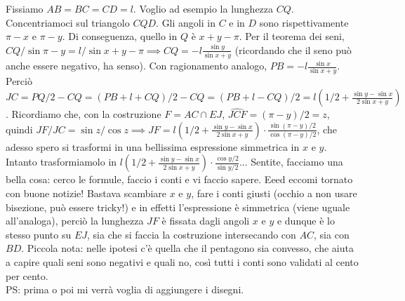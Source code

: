 \begin{sol}
  Fissiamo $AB=BC=CD=l$. Voglio ad esempio la lunghezza $CQ$. Concentriamoci sul triangolo $CQD$. Gli angoli in $C$ e in $D$ sono rispettivamente $\pi-x$ e $\pi-y$. Di conseguenza, quello in $Q$ è $x+y-\pi$. Per il teorema dei seni, $CQ/\sin{\pi-y}=l/\sin{x+y-\pi} \implies CQ=-l\frac{\sin{y}}{\sin{x+y}}$ (ricordando che il seno può anche essere negativo, ha senso). Con ragionamento analogo, $PB=-l\frac{\sin{x}}{\sin{x+y}}$.
  Perciò $JC=PQ/2-CQ=(PB+l+CQ)/2-CQ=(PB+l-CQ)/2=l\left(1/2+\frac{\sin{y}-\sin{x}}{2\sin{x+y}}\right)$.
  Ricordiamo che, con la costruzione $F=AC \cap EJ$, $\widehat{JCF}=(\pi-y)/2=z$, quindi $JF/JC=\sin{z}/\cos{z} \implies JF=l\left(1/2+\frac{\sin{y}-\sin{x}}{2\sin{x+y}}\right) \cdot \frac{\sin{(\pi-y)/2}}{\cos{(\pi-y)/2}}$, che adesso spero si trasformi in una bellissima espressione simmetrica in $x$ e $y$.
  Intanto trasformiamolo in $l\left(1/2+\frac{\sin{y}-\sin{x}}{2\sin{x+y}}\right) \cdot \frac{\cos{y/2}}{\sin{y/2}}$... Sentite, facciamo una bella cosa: cerco le formule, faccio i conti e vi faccio sapere. Eeed eccomi tornato con buone notizie! Bastava scambiare $x$ e $y$, fare i conti giusti (occhio a non usare bisezione, può essere tricky!) e in effetti l'espressione è simmetrica (viene uguale all'analoga), perciò la lunghezza $JF$ è fissata dagli angoli $x$ e $y$ e dunque è lo stesso punto su $EJ$, sia che si faccia la costruzione intersecando con $AC$, sia con $BD$. Piccola nota: nelle ipotesi c'è quella che il pentagono sia convesso, che aiuta a capire quali seni sono negativi e quali no, così tutti i conti sono validati al cento per cento. \\

  PS: prima o poi mi verrà voglia di aggiungere i disegni.
\end{sol}
